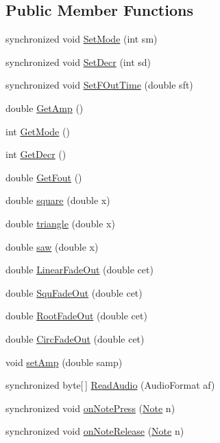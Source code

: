 \subsection*{Public Member Functions}
\begin{DoxyCompactItemize}
\item 
synchronized void \hyperlink{classmain_1_1_o_s_c_a7dc4cf1fe241cd88e0c8e4e76a223cf2}{Set\+Mode} (int sm)
\item 
synchronized void \hyperlink{classmain_1_1_o_s_c_a5b1d6c363df4df16fd6cd40744c10d70}{Set\+Decr} (int sd)
\item 
synchronized void \hyperlink{classmain_1_1_o_s_c_a944ad8d6279b5378c12c0c58fa465665}{Set\+F\+Out\+Time} (double sft)
\item 
double \hyperlink{classmain_1_1_o_s_c_a367d36787d80d32bb97acbcbb62404ec}{Get\+Amp} ()
\item 
int \hyperlink{classmain_1_1_o_s_c_aa191cdd4bb6c5057fe4f71307265d697}{Get\+Mode} ()
\item 
int \hyperlink{classmain_1_1_o_s_c_a719b7be131c51fdbc04830b5dbd194ae}{Get\+Decr} ()
\item 
double \hyperlink{classmain_1_1_o_s_c_a037f2b301a7de8f629ee590ce3c172b3}{Get\+Fout} ()
\item 
double \hyperlink{classmain_1_1_o_s_c_ab0fd030e37c446855b53c144194a035b}{square} (double x)
\item 
double \hyperlink{classmain_1_1_o_s_c_afe21605a56d6899ae580e72ee5b4cf07}{triangle} (double x)
\item 
double \hyperlink{classmain_1_1_o_s_c_a867dfe133e42c1ab3a03563f62d8c4a1}{saw} (double x)
\item 
double \hyperlink{classmain_1_1_o_s_c_a16608f6bef0ad4ddddda558f2ffce681}{Linear\+Fade\+Out} (double cet)
\item 
double \hyperlink{classmain_1_1_o_s_c_a8eaca900c304b41dfd1d8e2e747ebb62}{Squ\+Fade\+Out} (double cet)
\item 
double \hyperlink{classmain_1_1_o_s_c_ac847db01151aa5613999ac8daed804ff}{Root\+Fade\+Out} (double cet)
\item 
double \hyperlink{classmain_1_1_o_s_c_a129995e4961ba7e8e4c8b8c4de5da1ee}{Circ\+Fade\+Out} (double cet)
\item 
void \hyperlink{classmain_1_1_o_s_c_a7b6e93c3e91eebd23a9cea86becef269}{set\+Amp} (double samp)
\item 
synchronized byte\mbox{[}$\,$\mbox{]} \hyperlink{classmain_1_1_o_s_c_a8f2bb15946ac10c074cee1ea4fab03e0}{Read\+Audio} (Audio\+Format af)
\item 
synchronized void \hyperlink{classmain_1_1_o_s_c_ac2070c794fe40e23f27a1d357bd48efb}{on\+Note\+Press} (\hyperlink{classmain_1_1_note}{Note} n)
\item 
synchronized void \hyperlink{classmain_1_1_o_s_c_a7fd53cd80bc42d5d77161326cba5aa5f}{on\+Note\+Release} (\hyperlink{classmain_1_1_note}{Note} n)
\end{DoxyCompactItemize}


